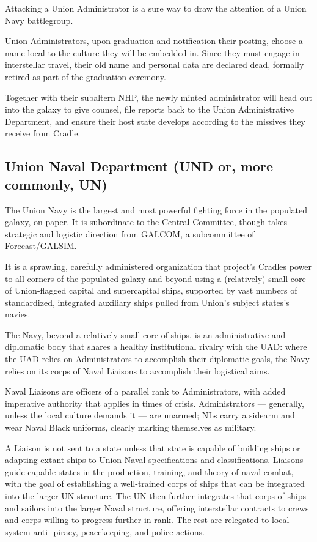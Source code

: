 Attacking a Union Administrator is a sure way to draw the attention of a Union Navy battlegroup.

Union Administrators, upon graduation and notification their posting, choose a name local to the
culture they will be embedded in. Since they must engage in interstellar travel, their old name
and personal data are declared dead, formally retired as part of the graduation ceremony.

Together with their subaltern NHP, the newly minted administrator will head out into the galaxy to
give counsel, file reports back to the Union Administrative Department, and ensure their host
state develops according to the missives they receive from Cradle.

\subsection{Union Naval Department (UND or, more commonly, UN)}

The Union Navy is the largest and most powerful fighting force in the populated galaxy, on paper.
It is subordinate to the Central Committee, though takes strategic and logistic direction from
GALCOM, a subcommittee of Forecast/GALSIM.

It is a sprawling, carefully administered organization that project’s Cradles power to all corners of
the populated galaxy and beyond using a (relatively) small core of Union-flagged capital and
supercapital ships, supported by vast numbers of standardized, integrated auxiliary ships pulled
from Union’s subject states’s navies.

The Navy, beyond a relatively small core of ships, is an administrative and diplomatic body that
shares a healthy institutional rivalry with the UAD: where the UAD relies on Administrators to
accomplish their diplomatic goals, the Navy relies on its corps of Naval Liaisons to accomplish
their logistical aims.

Naval Liaisons are officers of a parallel rank to Administrators, with added imperative authority
that applies in times of crisis. Administrators — generally, unless the local culture demands it —
are unarmed; NLs carry a sidearm and wear Naval Black uniforms, clearly marking themselves as
military.

A Liaison is not sent to a state unless that state is capable of building ships or adapting extant
ships to Union Naval specifications and classifications. Liaisons guide capable states in the
production, training, and theory of naval combat, with the goal of establishing a well-trained
corps of ships that can be integrated into the larger UN structure. The UN then further integrates
that corps of ships and sailors into the larger Naval structure, offering interstellar contracts to
crews and corps willing to progress further in rank. The rest are relegated to local system anti-
piracy, peacekeeping, and police actions.

